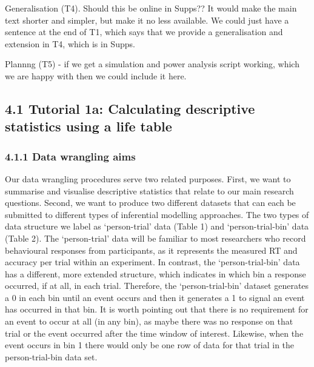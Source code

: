 \documentclass[
  man,floatsintext]{apa6}
\begin{document}
Generalisation (T4). Should this be online in Supps?? It would make the main text shorter and simpler, but make it no less available. We could just have a sentence at the end of T1, which says that we provide a generalisation and extension in T4, which is in Supps.

Plannng (T5) - if we get a simulation and power analysis script working, which we are happy with then we could include it here.

\subsection{4.1 Tutorial 1a: Calculating descriptive statistics using a life table}\label{tutorial-1a-calculating-descriptive-statistics-using-a-life-table}

\subsubsection{4.1.1 Data wrangling aims}\label{data-wrangling-aims}

Our data wrangling procedures serve two related purposes. First, we want to summarise and visualise descriptive statistics that relate to our main research questions. Second, we want to produce two different datasets that can each be submitted to different types of inferential modelling approaches. The two types of data structure we label as `person-trial' data (Table 1) and `person-trial-bin' data (Table 2). The `person-trial' data will be familiar to most researchers who record behavioural responses from participants, as it represents the measured RT and accuracy per trial within an experiment. In contrast, the `person-trial-bin' data has a different, more extended structure, which indicates in which bin a response occurred, if at all, in each trial. Therefore, the `person-trial-bin' dataset generates a 0 in each bin until an event occurs and then it generates a 1 to signal an event has occurred in that bin. It is worth pointing out that there is no requirement for an event to occur at all (in any bin), as maybe there was no response on that trial or the event occurred after the time window of interest. Likewise, when the event occurs in bin 1 there would only be one row of data for that trial in the person-trial-bin data set.
\end{document}
